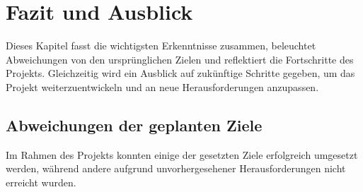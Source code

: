 \section{Fazit und Ausblick}\label{sec:fazit-ausblick}

Dieses Kapitel fasst die wichtigsten Erkenntnisse zusammen, beleuchtet Abweichungen von den ursprünglichen Zielen und reflektiert die Fortschritte des Projekts.
Gleichzeitig wird ein Ausblick auf zukünftige Schritte gegeben, um das Projekt weiterzuentwickeln und an neue Herausforderungen anzupassen.

\subsection{Abweichungen der geplanten Ziele}\label{subsec:abweichungen-der-geplanten-ziele}

Im Rahmen des Projekts konnten einige der gesetzten Ziele erfolgreich umgesetzt werden, während andere aufgrund unvorhergesehener Herausforderungen nicht erreicht wurden.

